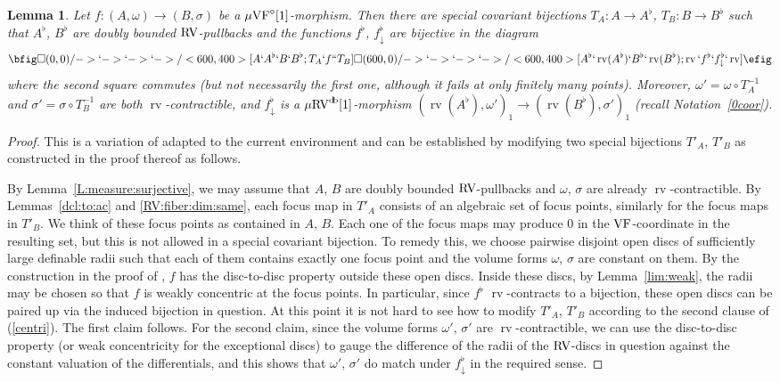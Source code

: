 \documentclass[12pt]{amsart}
\theoremstyle{plain}
\newtheorem{lem}[thm]{Lemma}
\theoremstyle{definition}
\theoremstyle{remark}
\numberwithin{equation}{section}
\theoremstyle{plain}
\newcommand{\VF}{\textup{VF}}
\newcommand{\RV}{\textup{RV}}
\newcommand{\0}{\emptyset}
\newcommand{\fun}{\longrightarrow}
\newcommand{\mgVF}{{\mu} {\VF}}
\newcommand{\mRV}{{\mu}{\RV}}
\DeclareMathOperator{\rv}{rv}
\DeclareMathOperator{\db}{d \! b}
\begin{document}
\begin{lem}\label{simul:special:dim:1}
Let $f : (A, \omega) \fun (B, \sigma)$ be a $\mgVF^{\diamond}[1]$-morphism.  Then there are special covariant bijections $T_A : A \fun A^{\flat}$, $T_B : B \fun B^{\flat}$ such that $A^{\flat}$, $B^{\flat}$ are doubly bounded $\RV$-pullbacks and the functions $f^{\flat}$, $f^{\flat}_{\downarrow}$ are bijective in
the diagram
\[
\bfig
  \square(0,0)/->`->`->`->/<600,400>[A`A^{\flat}`B`B^{\flat};
  T_A`f``T_B]
 \square(600,0)/->`->`->`->/<600,400>[A^{\flat}`\rv(A^{\flat})`B^{\flat} `\rv(B^{\flat});  \rv`f^{\flat}`f^{\flat}_{\downarrow}`\rv]
 \efig
\]
where the second square commutes (but not necessarily the first one, although it fails at only finitely many points). Moreover, $\omega' = \omega \circ T_A^{-1}$ and $\sigma' = \sigma \circ T_B^{-1}$ are both $\rv$-contractible, and  $f^{\flat}_{\downarrow}$ is a $\mRV^{\db}[1]$-morphism $(\rv(A^{\flat}), \omega')_{1} \fun (\rv(B^{\flat}), \sigma')_1$ (recall Notation~\ref{0coor}).
\end{lem}
\begin{proof}
This is a variation of \cite[Lemma~5.2]{Yin:int:acvf} adapted to the current environment and can be established by modifying two special bijections $T'_A$, $T'_B$ as constructed in the proof thereof as follows.

By Lemma~\ref{L:measure:surjective}, we may assume that $A$, $B$ are doubly bounded $\RV$-pullbacks and $\omega$, $\sigma$ are already $\rv$-contractible. By Lemmas~\ref{dcl:to:ac} and \ref{RV:fiber:dim:same}, each focus map in $T'_A$ consists of an algebraic set of focus points, similarly for the focus maps in $T'_B$. We think of these focus points as contained in $A$, $B$. Each one of the focus maps may produce $0$ in the $\VF$-coordinate in the resulting set, but this is not allowed in a special covariant bijection. To remedy  this, we choose pairwise disjoint open discs of sufficiently large definable radii such that each of them contains exactly one focus point and the volume forms $\omega$, $\sigma$ are constant on them. By the construction in the proof of \cite[Lemma~5.2]{Yin:int:acvf}, $f$ has the disc-to-disc property outside these open discs. Inside these discs, by Lemma~\ref{lim:weak}, the radii may be chosen so that $f$ is weakly concentric at the focus points. In particular, since $f^\flat$ $\rv$-contracts to a bijection,  these open discs can be paired up via the induced bijection  in question. At this point it is not hard to see how to modify $T'_A$, $T'_B$ according to the second clause of (\ref{centri}). The first claim follows. For the second claim, since the volume forms $\omega'$, $\sigma'$ are $\rv$-contractible, we can use the disc-to-disc property (or weak concentricity for the exceptional discs) to gauge the difference of the radii of the $\RV$-discs in question against the constant valuation of the differentials, and this shows that $\omega'$, $\sigma'$  do match under $f^{\flat}_{\downarrow}$ in the required sense.
\end{proof}
\end{document}
